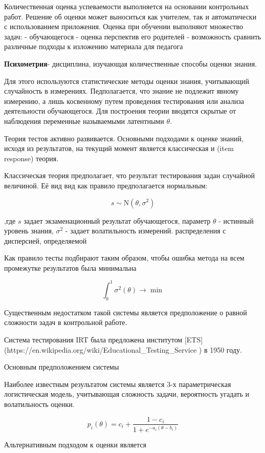
Количественная оценка успеваемости выполняется на основании контрольных работ. Решение об оценки может выноситься как учителем, так и автоматически с использованием приложения. Оценка при обучении выполняют множество задач:
- обучающегося
- оценка перспектив его родителей
- возможность сравнить различные подходы к изложению материала для педагога 


 \textbf{Психометрия}- дисциплина, изучающая количественные способы оценки знания.


Для этого используются статистические методы оценки знания, учитывающий случайность в измерениях.
Педполагается, что знание не подлежит явному измерению,
а лишь косвенному путем проведения тестирования или анализа деятельности обучающегося. Для построения теории вводятся скрытые от наблюдения переменные называемыми латентными $\theta$. 

Теория тестов активно развивается. Основными подходами к оценке знаний, исходя из результатов, 
на текущий момент является классическая и (item response) теория.

Классическая теория предполагает, что результат тестирования задан случайной величиной. Её вид вид как правило предполагается нормальным:

$$ 
    s \sim \mathrm{N}(\theta,\sigma^2)
$$

,где $s$ задает экзаменационный результат обучающегося, параметр $\theta$ - истинный уровень знания, $\sigma^2$ - задает волатильность измерений. распределения с дисперсией, определяемой 

Как правило тесты подбирают таким образом, чтобы ошибка метода на всем промежутке результатов была минимальна

$$
    \int_0^1 \sigma^2(\theta) \rightarrow \min
$$


Существенным недостатком такой системы является предположение о равной сложности задач в контрольной работе.


Система тестирования IRT была предложена институтом [ETS](https://en.wikipedia.org/wiki/Educational_Testing_Service ) в 1950 году.

Основным предположением системы

Наиболее известным результатом системы является 3-х параметрическая логистическая модель, учитывающая сложность задачи, вероятность угадать и волатильность оценки.

$$
    p_i(\theta) = c_i + \frac{1-c_i}{1+e^{-a_i(\theta-b_i)}}
$$


Альтернативным подходом к оценки является  \cite{corbett1994knowledge}


